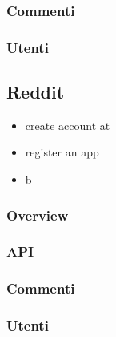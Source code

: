 \subsubsection {Commenti}
\subsubsection {Utenti}



\subsection {Reddit} %

\begin{itemize}
    \item create account at 
    \item register an app
    \item b
\end{itemize}


\subsubsection {Overview}
\subsubsection {API}

\subsubsection {Commenti}
\subsubsection {Utenti}



